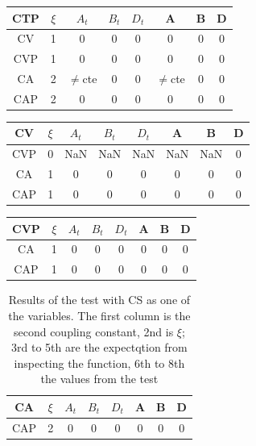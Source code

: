 \documentclass[twocolumn]{article}
\begin{document}
\begin{table}[H]
	\begin{tabular}{|c|c|c|c|c|c|c|c|}
		\hline
		CTP & $\xi $& $A_t$ & $B_t$ & $D_t$ & A & B & D \\
		\hline
		CV & 1 & 0 & 0 & 0 & 0 & 0 & 0\\
		\hline
		CVP & 1 & 0 & 0 & 0 & 0 & 0 & 0\\
		\hline
		CA & 2 & $\neq$cte & 0 & 0 & $\neq$cte & 0 & 0\\
		\hline
		CAP & 2 & 0 & 0 & 0 & 0 & 0 & 0\\
		\hline
	\end{tabular}
\end{table}

\begin{table}[H]
	\begin{tabular}{|c|c|c|c|c|c|c|c|}
		\hline
		CV & $\xi $& $A_t$ & $B_t$ & $D_t$ & A & B & D \\
		\hline
		CVP & 0 & NaN & NaN & NaN & NaN & NaN & 0\\
		\hline
		CA & 1 & 0 & 0 & 0 & 0 & 0 & 0\\
		\hline
		CAP & 1 & 0 & 0 & 0 & 0 & 0 & 0\\
		\hline
	\end{tabular}
\end{table}

\begin{table}[H]
	\begin{tabular}{|c|c|c|c|c|c|c|c|}
		\hline
		CVP & $\xi $& $A_t$ & $B_t$ & $D_t$ & A & B & D \\
		\hline
		CA & 1 & 0 & 0 & 0 & 0 & 0 & 0\\
		\hline
		CAP & 1 & 0 & 0 & 0 & 0 & 0 & 0\\
		\hline
	\end{tabular}
\end{table}

\begin{table}[H]
	\begin{tabular}{|c|c|c|c|c|c|c|c|}
		\hline
		CA & $\xi $& $A_t$ & $B_t$ & $D_t$ & A & B & D \\
		\hline
		CAP & 2 & 0 & 0 & 0 & 0 & 0 & 0\\
		\hline
	\end{tabular}
	\caption{Results of the test with CS as one of the variables. The first column is the second coupling constant, 2nd is $\xi$; 3rd to 5th are the expectqtion from inspecting the function, 6th to 8th the values from the test}
\end{table}
\end{document}
